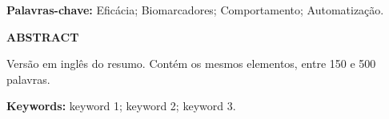 \vspace{1em}

\noindent \textbf{Palavras-chave:} Eficácia; Biomarcadores; Comportamento; Automatização. 

\newpage{} \thispagestyle{empty}

\begin{center}

\textbf{ABSTRACT}

\end{center}

\singlespacing
\justifying

\noindent Versão em inglês do resumo. Contém os mesmos elementos, entre 150 e 500 palavras.

\vspace{1em}

\noindent \textbf{Keywords:} keyword 1; keyword 2; keyword 3.

